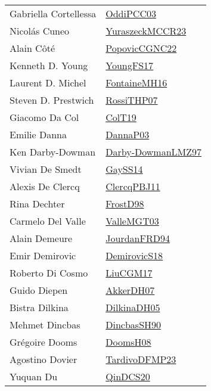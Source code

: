 {\begin{longtable}{p{4cm}p{20cm}}
Gabriella Cortellessa & \href{papers/OddiPCC03.pdf}{OddiPCC03}\cite{OddiPCC03} \\
Nicol{\'{a}}s Cuneo & \href{articles/YuraszeckMCCR23.pdf}{YuraszeckMCCR23}\cite{YuraszeckMCCR23} \\
Alain C{\^{o}}t{\'{e}} & \href{papers/PopovicCGNC22.pdf}{PopovicCGNC22}\cite{PopovicCGNC22} \\
Kenneth D. Young & \href{papers/YoungFS17.pdf}{YoungFS17}\cite{YoungFS17} \\
Laurent D. Michel & \href{papers/FontaineMH16.pdf}{FontaineMH16}\cite{FontaineMH16} \\
Steven D. Prestwich & \href{papers/RossiTHP07.pdf}{RossiTHP07}\cite{RossiTHP07} \\
Giacomo Da Col & \href{papers/ColT19.pdf}{ColT19}\cite{ColT19} \\
Emilie Danna & \href{papers/DannaP03.pdf}{DannaP03}\cite{DannaP03} \\
Ken Darby{-}Dowman & \href{articles/Darby-DowmanLMZ97.pdf}{Darby-DowmanLMZ97}\cite{Darby-DowmanLMZ97} \\
Vivian De Smedt & \href{papers/GaySS14.pdf}{GaySS14}\cite{GaySS14} \\
Alexis De Clercq & \href{papers/ClercqPBJ11.pdf}{ClercqPBJ11}\cite{ClercqPBJ11} \\
Rina Dechter & \href{papers/FrostD98.pdf}{FrostD98}\cite{FrostD98} \\
Carmelo Del Valle & \href{papers/ValleMGT03.pdf}{ValleMGT03}\cite{ValleMGT03} \\
Alain Demeure & \href{}{JourdanFRD94}\cite{JourdanFRD94} \\
Emir Demirovic & \href{papers/DemirovicS18.pdf}{DemirovicS18}\cite{DemirovicS18} \\
Roberto Di Cosmo & \href{papers/LiuCGM17.pdf}{LiuCGM17}\cite{LiuCGM17} \\
Guido Diepen & \href{papers/AkkerDH07.pdf}{AkkerDH07}\cite{AkkerDH07} \\
Bistra Dilkina & \href{papers/DilkinaDH05.pdf}{DilkinaDH05}\cite{DilkinaDH05} \\
Mehmet Dincbas & \href{articles/DincbasSH90.pdf}{DincbasSH90}\cite{DincbasSH90} \\
Gr{\'{e}}goire Dooms & \href{papers/DoomsH08.pdf}{DoomsH08}\cite{DoomsH08} \\
Agostino Dovier & \href{papers/TardivoDFMP23.pdf}{TardivoDFMP23}\cite{TardivoDFMP23} \\
Yuquan Du & \href{articles/QinDCS20.pdf}{QinDCS20}\cite{QinDCS20} \\

\end{longtable}}
